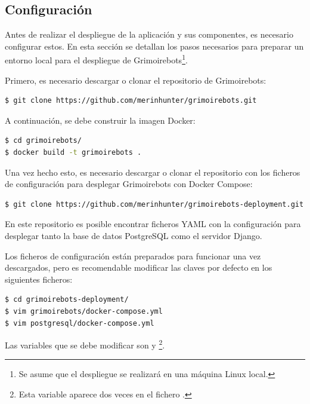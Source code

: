 \subsection{Configuración}

Antes de realizar el despliegue de la aplicación y sus componentes, es necesario configurar estos. En esta sección se detallan los pasos necesarios para preparar un entorno local para el despliegue de Grimoirebots\footnote{Se asume que el despliegue se realizará en una máquina Linux local.}.

Primero, es necesario descargar o clonar el repositorio de Grimoirebots:

\begin{lstlisting}[language=bash]
$ git clone https://github.com/merinhunter/grimoirebots.git
\end{lstlisting}

A continuación, se debe construir la imagen Docker:

\begin{lstlisting}[language=bash]
$ cd grimoirebots/
$ docker build -t grimoirebots .
\end{lstlisting}

Una vez hecho esto, es necesario descargar o clonar el repositorio con los ficheros de configuración para desplegar Grimoirebots con Docker Compose:

\begin{lstlisting}[language=bash]
$ git clone https://github.com/merinhunter/grimoirebots-deployment.git
\end{lstlisting}

En este repositorio es posible encontrar ficheros YAML con la configuración para desplegar tanto la base de datos PostgreSQL como el servidor Django.

Los ficheros de configuración están preparados para funcionar una vez descargados, pero es recomendable modificar las claves por defecto en los siguientes ficheros:

\begin{lstlisting}[language=bash]
$ cd grimoirebots-deployment/
$ vim grimoirebots/docker-compose.yml
$ vim postgresql/docker-compose.yml
\end{lstlisting}

Las variables que se debe modificar son  y \footnote{Esta variable aparece dos veces en el fichero .}.

